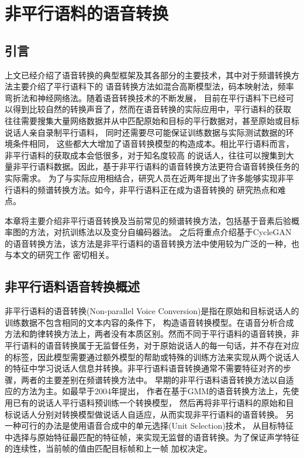 \chapter{非平行语料的语音转换}

\section{引言}
上文已经介绍了语音转换的典型框架及其各部分的主要技术，其中对于频谱转换方法主要介绍了平行语料下的
语音转换方法如混合高斯模型法，码本映射法，频率弯折法和神经网络法。随着语音转换技术的不断发展，
目前在平行语料下已经可以得到比较自然的转换声音了，然而在语音转换的实际应用中，平行语料的获取
往往需要搜集大量网络数据并从中匹配原始和目标的平行数据对，甚至原始或目标说话人亲自录制平行语料，
同时还需要尽可能保证训练数据与实际测试数据的环境条件相同，
这些都大大增加了语音转换模型的构造成本。相比平行语料而言，非平行语料的获取成本会低很多，对于知名度较高
的说话人，往往可以搜集到大量非平行语料数据。因此，基于非平行语料的语音转换方法更符合语音转换任务的实际需求。
为了与实际应用相结合，研究人员在近两年提出了许多能够实现非平行语料的频谱转换方法。如今，非平行语料正在成为语音转换的
研究热点和难点。

本章将主要介绍非平行语音转换及当前常见的频谱转换方法，包括基于音素后验概率图的方法，对抗训练法以及变分自编码器法。
之后将重点介绍基于CycleGAN的语音转换方法，该方法是非平行语料的语音转换方法中使用较为广泛的一种，也与本文的研究工作
密切相关。

\section{非平行语料语音转换概述}
非平行语料的语音转换(Non-parallel Voice Conversion)是指在原始和目标说话人的训练数据不包含相同的文本内容的条件下，
构造语音转换模型。在语音分析合成方法和韵律转换方法上，两者没有本质区别。然而不同于平行语料的语音转换，非平行语料的语音转换属于无监督任务，对于原始说话人的每一句话，并不存在对应
的标签，因此模型需要通过额外模型的帮助或特殊的训练方法来实现从两个说话人的特征中学习说话人信息并转换。非平行语料语音转换通常不需要特征对齐的步骤，两者的主要差别在频谱转换方法中。
早期的非平行语料语音转换方法以自适应的方法为主\cite{mouchtaris2004non,lee2006map}。如最早于2004年提出\cite{mouchtaris2004non}，
作者在基于GMM的语音转换方法上，先使用已有的说话人平行语料预训练一个转换模型，
然后再将非平行语料的原始和目标说话人分别对转换模型做说话人自适应，从而实现非平行语料的语音转换。
另一种可行的办法是使用语音合成中的单元选择(Unit Selection)技术\cite{sundermann2006text}，
从目标特征中选择与原始特征最匹配的特征帧，来实现无监督的语音转换。为了保证声学特征的连续性，当前帧的值由匹配目标帧和上一帧
加权决定。

